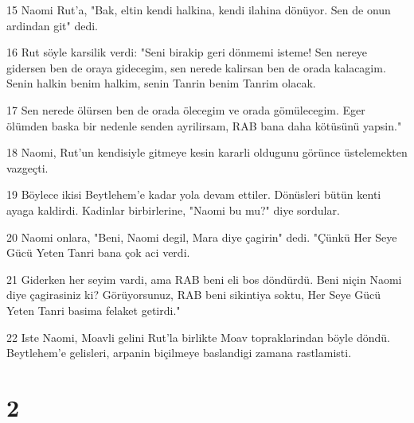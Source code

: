 \par 15 Naomi Rut'a, "Bak, eltin kendi halkina, kendi ilahina dönüyor. Sen de onun ardindan git" dedi.
\par 16 Rut söyle karsilik verdi: "Seni birakip geri dönmemi isteme! Sen nereye gidersen ben de oraya gidecegim, sen nerede kalirsan ben de orada kalacagim. Senin halkin benim halkim, senin Tanrin benim Tanrim olacak.
\par 17 Sen nerede ölürsen ben de orada ölecegim ve orada gömülecegim. Eger ölümden baska bir nedenle senden ayrilirsam, RAB bana daha kötüsünü yapsin."
\par 18 Naomi, Rut'un kendisiyle gitmeye kesin kararli oldugunu görünce üstelemekten vazgeçti.
\par 19 Böylece ikisi Beytlehem'e kadar yola devam ettiler. Dönüsleri bütün kenti ayaga kaldirdi. Kadinlar birbirlerine, "Naomi bu mu?" diye sordular.
\par 20 Naomi onlara, "Beni, Naomi degil, Mara diye çagirin" dedi. "Çünkü Her Seye Gücü Yeten Tanri bana çok aci verdi.
\par 21 Giderken her seyim vardi, ama RAB beni eli bos döndürdü. Beni niçin Naomi diye çagirasiniz ki? Görüyorsunuz, RAB beni sikintiya soktu, Her Seye Gücü Yeten Tanri basima felaket getirdi."
\par 22 Iste Naomi, Moavli gelini Rut'la birlikte Moav topraklarindan böyle döndü. Beytlehem'e gelisleri, arpanin biçilmeye baslandigi zamana rastlamisti.

\chapter{2}

